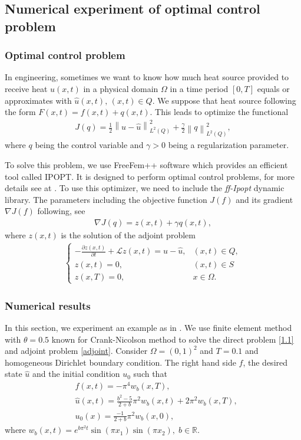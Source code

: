 
\subsection{Numerical experiment of optimal control problem}
\subsubsection{Optimal control problem}
\quad In engineering, sometimes we want to know how much heat source provided to receive heat $u(x, t)$ in a physical domain $\Omega$ in a time period $[0, T]$ equals or approximates with $\hat{u}(x, t),\, (x, t)\in Q.$ We suppose that heat source following the form $F(x, t)=f(x, t)+q(x, t)$. This leads to optimize the functional
\begin{align}\label{J}
	J(q)=\frac{1}{2}\left\|u-\hat{u}\right\|_{L^2(Q)}^2+\frac{\gamma}{2}\left\|q\right\|_{L^2(Q)}^2,
\end{align}
where $q$ being the control variable and $\gamma>0$ being a regularization parameter.

To solve this problem, we use FreeFem++ software which provides an efficient tool called IPOPT. It is designed to perform optimal control problems, for more details see at \cite{}. To use this optimizer, we need to include the \textit{ff-Ipopt} dynamic library. The parameters including the objective function $J(f)$ and its gradient $\nabla J(f)$ following, see \cite{}
\begin{align}\label{gradJ}
	\nabla J(q)=z(x, t)+\gamma q(x, t),
	\end{align}
	where $z(x, t)$ is the solution of the adjoint problem
	\begin{align}\label{adjoint} 
	\begin{cases}
		-\frac{\partial z(x, t)}{\partial t}+\mathcal{L}z(x, t)=u-\hat{u}, & (x, t)\in Q,\\
		z(x, t)=0, & (x, t)\in S\\
		z(x, T)=0, & x\in \Omega.
	\end{cases}
\end{align}

\subsubsection{Numerical results}
\quad In this section, we experiment an example as in \cite{}. We use finite element method with $\theta=0.5$ known for Crank-Nicolson method to solve the direct problem \eqref{1.1} and adjoint problem \eqref{adjoint}. Consider $\Omega=(0, 1)^2$ and $T=0.1$ and homogeneous Dirichlet boundary condition. The right hand side $f$, the desired state $\hat{u}$ and the initial condition $u_0$ such that
\begin{align*}
	&f(x, t)=-\pi^4w_b(x, T),\\
	&\hat{u}(x, t)=\frac{b^2-5}{2+b}\pi^2 w_b(x, t)+2\pi^2w_b(x, T),\\
	&u_0(x)=\frac{-1}{2+b}\pi^2w_b(x, 0),
\end{align*}
where $w_b(x, t)=e^{b\pi^2 t}\sin(\pi x_1)\sin(\pi x_2), \; b\in \mathbb{R}$.

